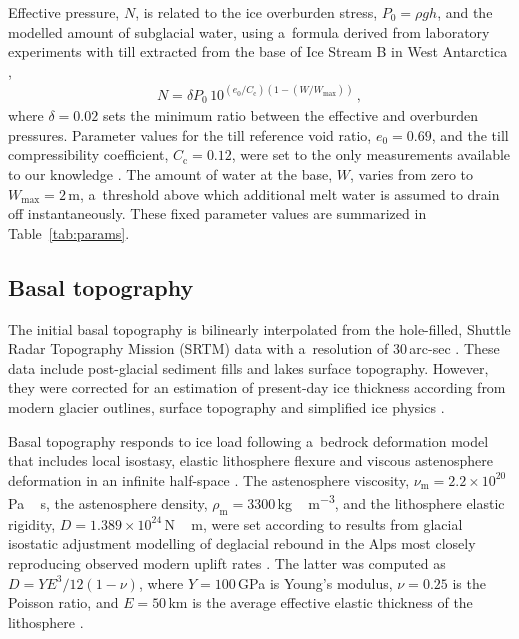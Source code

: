 \documentclass[tc, manuscript]{copernicus}
\begin{document}
    Effective pressure, $N$, is related to the ice overburden stress, $P_0=\rho
    gh$, and the modelled amount of subglacial water, using a~formula derived
    from laboratory experiments with till extracted from the base of Ice Stream
    B in West Antarctica \citep{Tulaczyk.etal.2000, Bueler.Pelt.2015},
    \begin{align}
      N = \delta P_0 \, 10^{(e_0/C_{\mathrm{c}}) (1 - (W/W_{\text{max}}))} \,,
    \end{align}
    where $\delta=0.02$ sets the minimum ratio between the effective and
    overburden pressures. Parameter values for the till reference void ratio,
    $e_0=0.69$, and the till compressibility coefficient,
    $C_{\mathrm{c}}=0.12$, were set to the only measurements available to our
    knowledge \citep{Tulaczyk.etal.2000}. The amount of water at the base, $W$,
    varies from zero to $W_{\text{max}}=2$\,m, a~threshold above which
    additional melt water is assumed to drain off instantaneously. These fixed
    parameter values are summarized in Table~\ref{tab:params}.


\subsection{Basal topography}
\label{sec:bedrock}

    The initial basal topography is bilinearly interpolated from the
    hole-filled, Shuttle Radar Topography Mission (SRTM) data with a~resolution
    of 30\,arc-sec \citep{Jarvis.etal.2008}. These data include post-glacial
    sediment fills and lakes surface topography. However, they were corrected
    for an estimation of present-day ice thickness according from modern
    glacier outlines, surface topography and simplified ice physics
    \citep{Huss.Farinotti.2012}.

    Basal topography responds to ice load following a~bedrock deformation model
    that includes local isostasy, elastic lithosphere flexure and viscous
    astenosphere deformation in an infinite half-space
    \citep{Lingle.Clark.1985,Bueler.etal.2007}. The astenosphere viscosity,
    $\nu_{\mathrm{m}}=2.2\times10^{20}$\,\unit{Pa\,s}, the astenosphere
    density, $\rho_{\mathrm{m}}=3300$\,\unit{kg\,m^{-3}}, and the lithosphere
    elastic rigidity, $D=1.389 \times 10^{24}$\,\unit{N\,m}, were set according to
    results from glacial isostatic adjustment modelling of deglacial rebound in
    the Alps most closely reproducing observed modern uplift rates
    \citep[Table~\ref{tab:params};][Supplementary Fig.~7]{Mey.etal.2016}. The
    latter was computed as $D=YE^3/12(1-\nu)$, where $Y=100$\,GPa is Young's
    modulus, $\nu=0.25$ is the Poisson ratio, and $E=50$\,km is the average
    effective elastic thickness of the lithosphere
    \citep[Table~\ref{tab:params};][]{Mey.etal.2016}.
\end{document}
